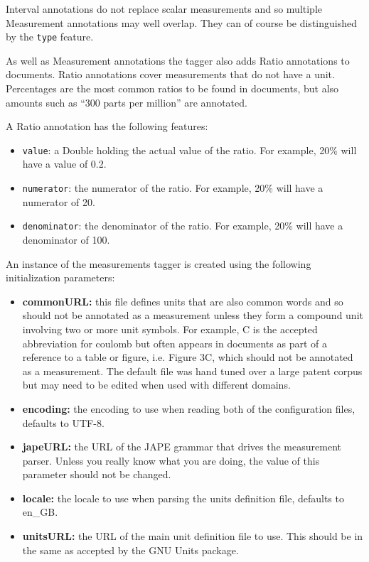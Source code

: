 Interval annotations do not replace scalar measurements and so multiple
Measurement annotations may well overlap. They can of course be distinguished by
the \texttt{type} feature.

As well as Measurement annotations the tagger also adds Ratio annotations to
documents. Ratio annotations cover measurements that do not have a unit.
Percentages are the most common ratios to be found in documents, but also
amounts such as ``300 parts per million'' are annotated.

A Ratio annotation has the following features:

\begin{itemize}
\item \texttt{value}: a Double holding the actual value of the ratio. For
  example, 20\% will have a value of 0.2.
\item \texttt{numerator}: the numerator of the ratio. For example, 20\% will
  have a numerator of 20.
\item \texttt{denominator}: the denominator of the ratio. For example, 20\% will
  have a denominator of 100.
\end{itemize}

An instance of the measurements tagger is created using the following
initialization parameters:

\begin{itemize}
\item \textbf{commonURL:} this file defines units that are also common words and
  so should not be annotated as a measurement unless they form a compound unit
  involving two or more unit symbols. For example, C is the accepted
  abbreviation for coulomb but often appears in documents as part of a reference
  to a table or figure, i.e. Figure 3C, which should not be annotated as a
  measurement. The default file was hand tuned over a large patent corpus but
  may need to be edited when used with different domains.
\item \textbf{encoding:} the encoding to use when reading both of the
  configuration files, defaults to UTF-8.
\item \textbf{japeURL:} the URL of the JAPE grammar that drives the measurement
  parser. Unless you really know what you are doing, the value of this parameter
  should not be changed.
\item \textbf{locale:} the locale to use when parsing the units definition file,
  defaults to en\_GB.
\item \textbf{unitsURL:} the URL of the main unit definition file to use. This
  should be in the same
 as accepted by the GNU Units package.
\end{itemize}

